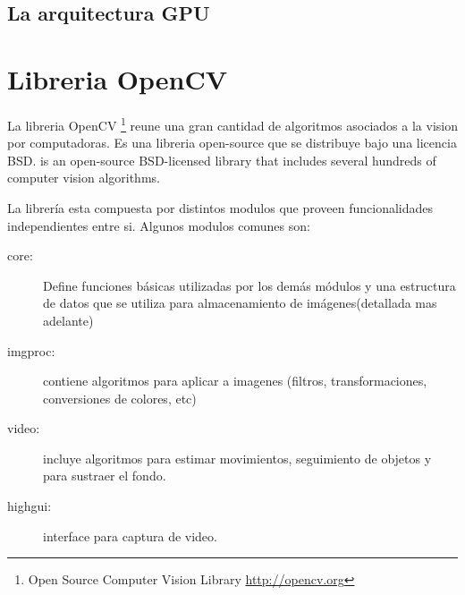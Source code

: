\documentclass[a4paper,10pt]{report}
\begin{document}
\section{La arquitectura GPU}

\chapter{Libreria OpenCV}

La libreria OpenCV \footnote{Open Source Computer Vision Library \url{http://opencv.org}} reune una gran cantidad de algoritmos asociados a la vision por computadoras. 
Es una libreria open-source que se distribuye bajo una licencia BSD.  is an open-source BSD-licensed library that includes several hundreds of computer vision algorithms. 

La librería esta compuesta por distintos modulos que proveen funcionalidades independientes entre si. Algunos modulos comunes son:
\begin{description}
 \item[core:] Define funciones básicas utilizadas por los demás módulos y una estructura de datos que se utiliza para almacenamiento de imágenes(detallada mas adelante)  
 \item[imgproc:] contiene algoritmos para aplicar a imagenes (filtros, transformaciones, conversiones de colores, etc)
 \item[video:] incluye algoritmos para estimar movimientos, seguimiento de objetos y para sustraer el fondo.
 \item[highgui:] interface para captura de video.
\end{description}

\end{document}
